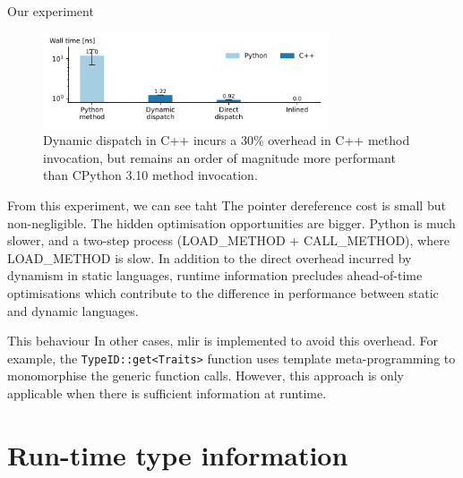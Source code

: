Our experiment

\begin{figure}[H]
    \centering
    \includegraphics[width=0.75\textwidth]{images/impact_dynamism/dispatch.pdf}
    \caption{Dynamic dispatch in C++ incurs a $30\%$ overhead in C++ method invocation, but remains an order of magnitude more performant than CPython 3.10 method invocation.}
    \label{figure:impact-dispatch}
\end{figure}


From this experiment, we can see taht
The pointer dereference cost is small but non-negligible.
The hidden optimisation opportunities are bigger.
Python is much slower, and a two-step process (LOAD\_METHOD + CALL\_METHOD), where LOAD\_METHOD is slow.
In addition to the direct overhead incurred by dynamism in static languages, runtime information precludes ahead-of-time optimisations which contribute to the difference in performance between static and dynamic languages.


This behaviour
In other cases, \ac{mlir} is implemented to avoid this overhead. For example, the \texttt{TypeID::get<Traits>} function uses template meta-programming to monomorphise the generic function calls. However, this approach is only applicable when there is sufficient information at runtime.




\section{Run-time type information}
\label{chap:dynamism-pattern-rewriting-rtti}

